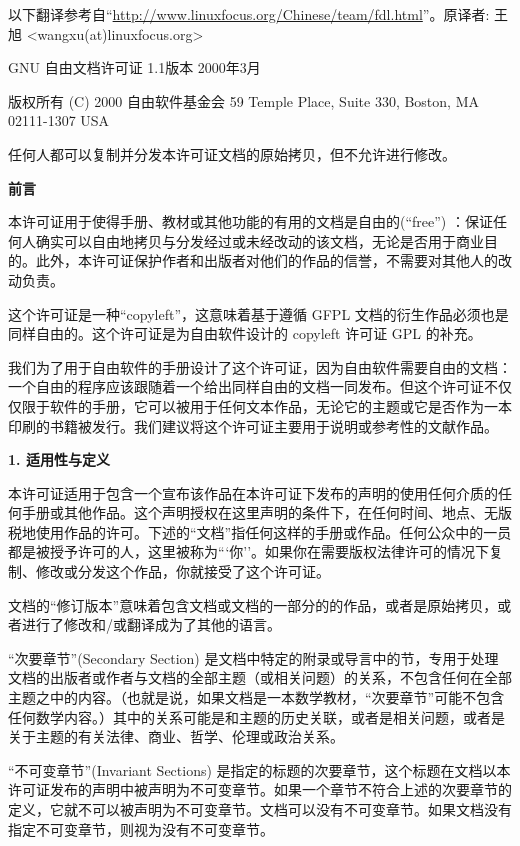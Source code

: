 \ifdefined\chs
以下翻译参考自``\url{http://www.linuxfocus.org/Chinese/team/fdl.html}''。原译者: 王旭 <wangxu(at)linuxfocus.org>

GNU 自由文档许可证 1.1版本 2000年3月

版权所有 (C) 2000 自由软件基金会 59 Temple Place, Suite 330, Boston, MA 02111-1307 USA 

任何人都可以复制并分发本许可证文档的原始拷贝，但不允许进行修改。


\begin{center}
{\bf\large 前言}
\end{center}

本许可证用于使得手册、教材或其他功能的有用的文档是自由的(``free'') ：保证任何人确实可以自由地拷贝与分发经过或未经改动的该文档，无论是否用于商业目的。此外，本许可证保护作者和出版者对他们的作品的信誉，不需要对其他人的改动负责。


这个许可证是一种``copyleft''，这意味着基于遵循 GFPL 文档的衍生作品必须也是同样自由的。这个许可证是为自由软件设计的 copyleft 许可证 GPL 的补充。


我们为了用于自由软件的手册设计了这个许可证，因为自由软件需要自由的文档：一个自由的程序应该跟随着一个给出同样自由的文档一同发布。但这个许可证不仅仅限于软件的手册，它可以被用于任何文本作品，无论它的主题或它是否作为一本印刷的书籍被发行。我们建议将这个许可证主要用于说明或参考性的文献作品。


\begin{center}
{\Large\bf 1. 适用性与定义\par}
\end{center}

本许可证适用于包含一个宣布该作品在本许可证下发布的声明的使用任何介质的任何手册或其他作品。这个声明授权在这里声明的条件下，在任何时间、地点、无版税地使用作品的许可。下述的``文档''指任何这样的手册或作品。任何公众中的一员都是被授予许可的人，这里被称为```你''。如果你在需要版权法律许可的情况下复制、修改或分发这个作品，你就接受了这个许可证。

文档的``修订版本''意味着包含文档或文档的一部分的的作品，或者是原始拷贝，或者进行了修改和/或翻译成为了其他的语言。

``次要章节''(Secondary Section) 是文档中特定的附录或导言中的节，专用于处理文档的出版者或作者与文档的全部主题（或相关问题）的关系，不包含任何在全部主题之中的内容。（也就是说，如果文档是一本数学教材，``次要章节''可能不包含任何数学内容。）其中的关系可能是和主题的历史关联，或者是相关问题，或者是关于主题的有关法律、商业、哲学、伦理或政治关系。

``不可变章节''(Invariant Sections) 是指定的标题的次要章节，这个标题在文档以本许可证发布的声明中被声明为不可变章节。如果一个章节不符合上述的次要章节的定义，它就不可以被声明为不可变章节。文档可以没有不可变章节。如果文档没有指定不可变章节，则视为没有不可变章节。

